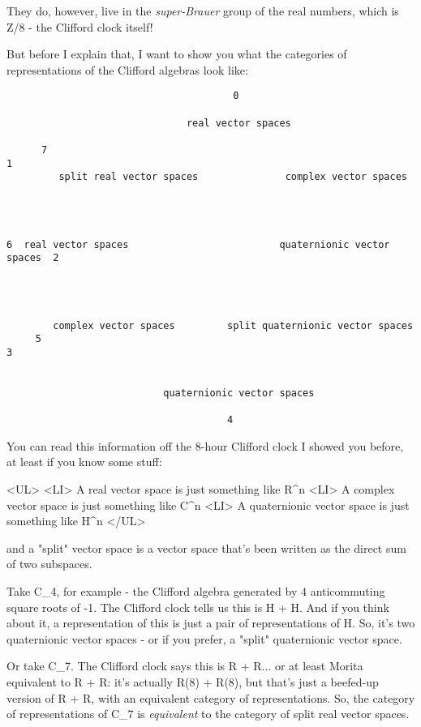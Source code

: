 They do, however, live in the \emph{super-Brauer} group of the real numbers,
which is Z/8 - the Clifford clock itself!

But before I explain that, I want to show you what the categories of
representations of the Clifford algebras look like:

\begin{verbatim}
                                       0

                               real vector spaces
                                
      7                                                                1 
         split real vector spaces               complex vector spaces
 
                     

 
6  real vector spaces                          quaternionic vector spaces  2




        complex vector spaces         split quaternionic vector spaces
     5                                                                   3

                             
                           quaternionic vector spaces

                                      4
\end{verbatim}
    
You can read this information off the 8-hour Clifford clock I showed you 
before, at least if you know some stuff:

<UL>
<LI> 
A real vector space is just something like R^{n}
<LI>
A complex vector space is just something like C^{n}
<LI>
A quaternionic vector space is just something like H^{n}
</UL>

and a "split" vector space is a vector space that's been written 
as the direct sum of two subspaces.  

Take C_{4}, 
for example - the Clifford algebra generated by 4 anticommuting 
square roots of -1.  The Clifford clock tells us this is H + H.  And if you
think about it, a representation of this is just a pair of representations of
H.  So, it's two quaternionic vector spaces - or if you 
prefer, a "split" quaternionic vector space.

Or take C_{7}.  
The Clifford clock says this is R + R... or at least Morita 
equivalent to R + R: it's actually R(8) + R(8), but that's just a beefed-up
version of R + R, with an equivalent category of representations.  So, the 
category of representations of C_{7} is \emph{equivalent} 
to the category of split 
real vector spaces.

